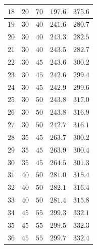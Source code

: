 \documentclass[a4paper]{ltxdoc}
\begin{document}
\begin{multicols}{2}
\begin{tabular}{|c|c|c|c|c|}
        \hline $18$       & $20$           & $70$           & $197.6$         & $375.6$        \\
        \hline
        \hline $19$       & $30$           & $40$           & $241.6$         & $280.7$        \\
        \hline $20$       & $30$           & $40$           & $243.3$         & $282.5$        \\
        \hline $21$       & $30$           & $40$           & $243.5$         & $282.7$        \\
        \hline
        \hline $22$       & $30$           & $45$           & $243.6$         & $300.2$        \\
        \hline $23$       & $30$           & $45$           & $242.6$         & $299.4$        \\
        \hline $24$       & $30$           & $45$           & $242.9$         & $299.6$        \\
        \hline $25$       & $30$           & $50$           & $243.8$         & $317.0$        \\
        \hline $26$       & $30$           & $50$           & $243.8$         & $316.9$        \\
        \hline $27$       & $30$           & $50$           & $242.7$         & $316.1$        \\
        \hline
        \hline $28$       & $35$           & $45$           & $263.7$         & $300.2$        \\
        \hline $29$       & $35$           & $45$           & $263.9$         & $300.4$        \\
        \hline $30$       & $35$           & $45$           & $264.5$         & $301.3$        \\
        \hline
        \hline $31$       & $40$           & $50$           & $281.0$         & $315.4$        \\
        \hline $32$       & $40$           & $50$           & $282.1$         & $316.4$        \\
        \hline $33$       & $40$           & $50$           & $281.4$         & $315.8$        \\
        \hline
        \hline $34$       & $45$           & $55$           & $299.3$         & $332.1$        \\
        \hline $35$       & $45$           & $55$           & $299.5$         & $332.3$        \\
        \hline $36$       & $45$           & $55$           & $299.7$         & $332.4$        \\
        \hline
    \end{tabular}
\end{multicols}
\end{document}
